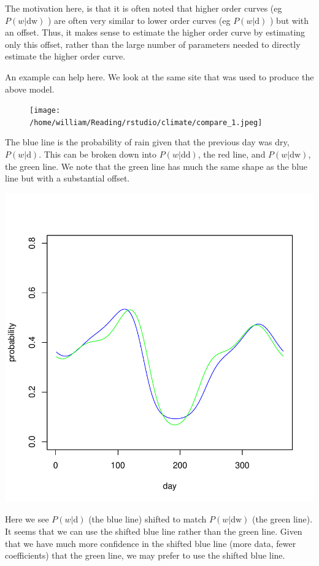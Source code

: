 \documentclass{article}
\begin{document}
The motivation here, is that it is often noted that higher order
curves (eg $P(w|\mbox{dw})$ ) are often very similar to lower
order curves  (eg $P(w|\mbox{d})$ ) but with an offset.   Thus,
it makes sense to estimate the higher order curve
by estimating only this offset, rather than the large number
of parameters needed to directly estimate the higher order curve.

An example can help here.   We look at the same site that was
used to produce the above model.

\begin{figure}[H]
\centering
\texttt{[image: /home/william/Reading/rstudio/climate/compare\_1.jpeg]}
\end{figure}

The blue line is the probability of rain given that the previous
day was dry, $P(w|\mbox{d})$.   This can be broken down into
$P(w|\mbox{dd})$, the red line, and $P(w|\mbox{dw})$, the green line.
We note that the green line has much the same shape as the
blue line but with a substantial offset.

\includegraphics{climate_vignette-010}

Here we see $P(w|\mbox{d})$ (the blue line) shifted to match
$P(w|\mbox{dw})$ (the green line).  It seems that we can use
the shifted blue line rather than the green line.  Given that we have
much more confidence in the shifted blue line (more data, fewer coefficients)
that the green line, we may prefer to use the shifted blue line.
\end{document}
